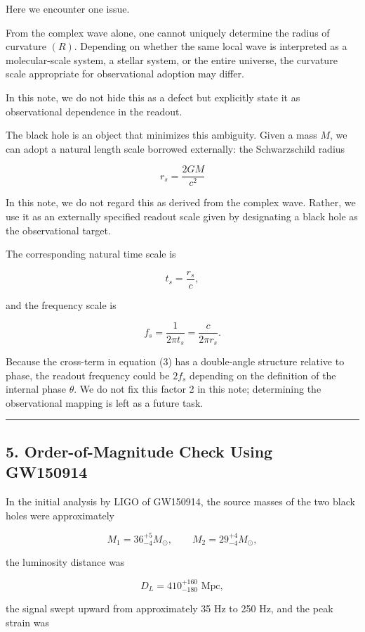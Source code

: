 \documentclass[
  a4paper,
]{article}
\begin{document}
Here we encounter one issue.

From the complex wave alone, one cannot uniquely determine the radius of
curvature \((R)\). Depending on whether the same local wave is
interpreted as a molecular-scale system, a stellar system, or the entire
universe, the curvature scale appropriate for observational adoption may
differ.

In this note, we do not hide this as a defect but explicitly state it as
observational dependence in the readout.

The black hole is an object that minimizes this ambiguity. Given a mass
\(M\), we can adopt a natural length scale borrowed externally: the
Schwarzschild radius

\[r_s=\frac{2GM}{c^2} \tag{9}\]

In this note, we do not regard this as derived from the complex wave.
Rather, we use it as an externally specified readout scale given by
designating a black hole as the observational target.

The corresponding natural time scale is

\[t_s=\frac{r_s}{c},\]

and the frequency scale is

\[f_s=\frac{1}{2\pi t_s} = \frac{c}{2\pi r_s}. \tag{10}\]

Because the cross-term in equation (3) has a double-angle structure
relative to phase, the readout frequency could be \(2f_s\) depending on
the definition of the internal phase \(\theta\). We do not fix this
factor 2 in this note; determining the observational mapping is left as
a future task.

\begin{center}\rule{0.5\linewidth}{0.5pt}\end{center}

\subsection{5. Order-of-Magnitude Check Using
GW150914}\label{order-of-magnitude-check-using-gw150914}

In the initial analysis by LIGO of GW150914, the source masses of the
two black holes were approximately

\[M_1=36_{-4}^{+5}M_\odot,\qquad M_2=29_{-4}^{+4}M_\odot,\]

the luminosity distance was

\[D_L=410_{-180}^{+160} \text{ Mpc},\]

the signal swept upward from approximately 35 Hz to 250 Hz, and the peak
strain was
\end{document}
